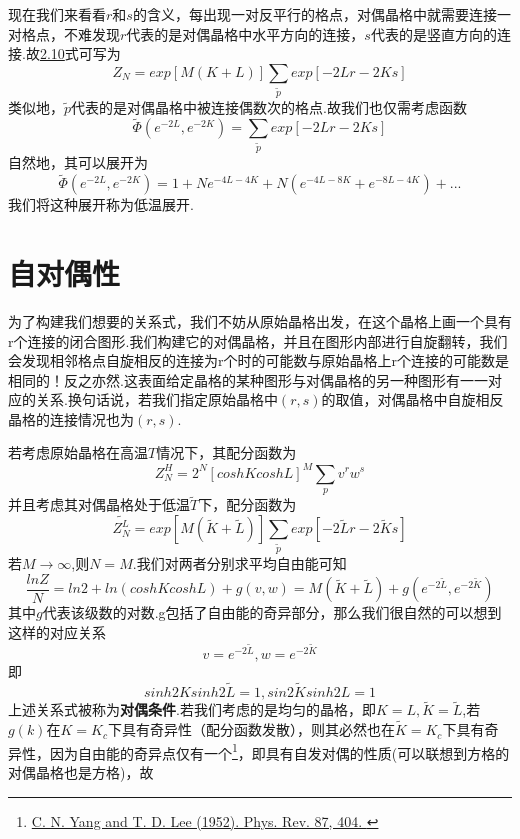 \documentclass[a4paper]{book}
\begin{document}
现在我们来看看$r$和$s$的含义，每出现一对反平行的格点，对偶晶格中就需要连接一对格点，不难发现$r$代表的是对偶晶格中水平方向的连接，$s$代表的是竖直方向的连接.故\hyperref[2.10]{2.10}式可写为
\begin{equation}
	Z_N=exp[M(K+L)]\sum_{\tilde{p}}exp[-2Lr-2Ks]
\end{equation}
类似地，$\tilde{p}$代表的是对偶晶格中被连接偶数次的格点.故我们也仅需考虑函数
\begin{equation}
	\tilde{\varPhi}(e^{-2L},e^{-2K})=\sum_{\tilde{p}}exp[-2Lr-2Ks]
\end{equation}
自然地，其可以展开为
\begin{equation}
\tilde{\varPhi}(e^{-2L},e^{-2K})=1+Ne^{-4L-4K}+N(e^{-4L-8K}+e^{-8L-4K})+...
\end{equation}
我们将这种展开称为低温展开.
\section{自对偶性}
为了构建我们想要的关系式，我们不妨从原始晶格出发，在这个晶格上画一个具有r个连接的闭合图形.我们构建它的对偶晶格，并且在图形内部进行自旋翻转，我们会发现相邻格点自旋相反的连接为r个时的可能数与原始晶格上r个连接的可能数是相同的！反之亦然.这表面给定晶格的某种图形与对偶晶格的另一种图形有一一对应的关系.换句话说，若我们指定原始晶格中$(r,s)$的取值，对偶晶格中自旋相反晶格的连接情况也为$(r,s)$.\par 
若考虑原始晶格在高温$T$情况下，其配分函数为
\begin{equation}
		Z_N^{H}=2^N[coshKcoshL]^M\sum_{p}v^rw^s
\end{equation}
并且考虑其对偶晶格处于低温$\tilde{T}$下，配分函数为
\begin{equation}
		\tilde{Z_N^{L}}=exp[M(\tilde{K}+\tilde{L})]\sum_{\tilde{p}}exp[-2\tilde{L}r-2\tilde{K}s]
\end{equation}
若$M\rightarrow\infty$,则$N=M$.我们对两者分别求平均自由能可知
\begin{equation}
	\frac{lnZ}{N}=ln2+ln(coshKcoshL)+g(v,w)=M(\tilde{K}+\tilde{L})+g(e^{-2\tilde{L}},e^{-2\tilde{K}})
\end{equation}
其中$g$代表该级数的对数.g包括了自由能的奇异部分，那么我们很自然的可以想到这样的对应关系
\begin{equation}
	v=e^{-2\tilde{L}},w=e^{-2\tilde{K}}
\end{equation}
即
\begin{equation}\label{2.18}
	sinh2Ksinh2\tilde{L}=1,sin2\tilde{K}sinh2L=1
\end{equation}
上述关系式被称为\textbf{对偶条件}.若我们考虑的是均匀的晶格，即$K=L,\tilde{K}=\tilde{L}$,若$g(k)$在$K=K_c$下具有奇异性（配分函数发散），则其必然也在$\tilde{K}=K_c$下具有奇异性，因为自由能的奇异点仅有一个\footnote[1]{\href{https://journals.aps.org/pr/abstract/10.1103/PhysRev.87.404}{C. N. Yang and T. D. Lee (1952). Phys. Rev. 87, 404. }}，即具有自发对偶的性质(可以联想到方格的对偶晶格也是方格)，故
\end{document}
